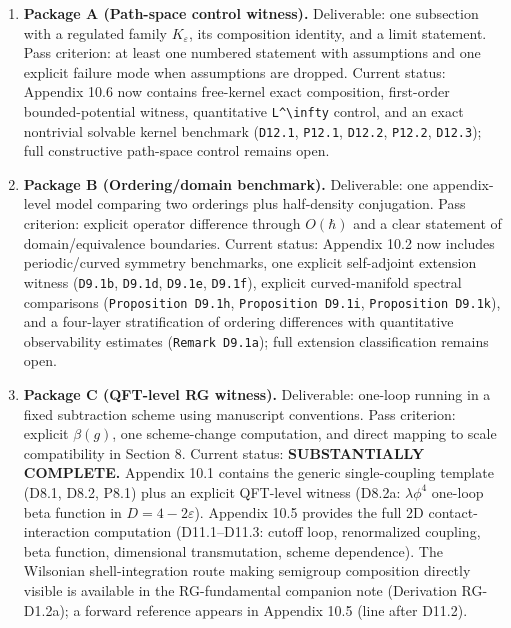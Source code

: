 \documentclass[
]{article}
\providecommand{\tightlist}{%
  \setlength{\itemsep}{0pt}\setlength{\parskip}{0pt}}
\begin{document}
\begin{enumerate}
\def\labelenumi{\arabic{enumi}.}
\tightlist
\item
  \textbf{Package A (Path-space control witness).} Deliverable: one
  subsection with a regulated family \(K_\varepsilon\), its composition
  identity, and a limit statement. Pass criterion: at least one numbered
  statement with assumptions and one explicit failure mode when
  assumptions are dropped. Current status: Appendix 10.6 now contains
  free-kernel exact composition, first-order bounded-potential witness,
  quantitative \texttt{L\^{}\textbackslash{}infty} control, and an exact
  nontrivial solvable kernel benchmark (\texttt{D12.1}, \texttt{P12.1},
  \texttt{D12.2}, \texttt{P12.2}, \texttt{D12.3}); full constructive
  path-space control remains open.
\item
  \textbf{Package B (Ordering/domain benchmark).} Deliverable: one
  appendix-level model comparing two orderings plus half-density
  conjugation. Pass criterion: explicit operator difference through
  \(O(\hbar)\) and a clear statement of domain/equivalence boundaries.
  Current status: Appendix 10.2 now includes periodic/curved symmetry
  benchmarks, one explicit self-adjoint extension witness
  (\texttt{D9.1b}, \texttt{D9.1d}, \texttt{D9.1e}, \texttt{D9.1f}),
  explicit curved-manifold spectral comparisons
  (\texttt{Proposition\ D9.1h}, \texttt{Proposition\ D9.1i},
  \texttt{Proposition\ D9.1k}), and a four-layer stratification of
  ordering differences with quantitative observability estimates
  (\texttt{Remark\ D9.1a}); full extension classification remains open.
\item
  \textbf{Package C (QFT-level RG witness).} Deliverable: one-loop
  running in a fixed subtraction scheme using manuscript conventions.
  Pass criterion: explicit \(\beta(g)\), one scheme-change computation,
  and direct mapping to scale compatibility in Section 8. Current
  status: \textbf{SUBSTANTIALLY COMPLETE.} Appendix 10.1 contains the
  generic single-coupling template (D8.1, D8.2, P8.1) plus an explicit
  QFT-level witness (D8.2a: \(\lambda\phi^4\) one-loop beta function in
  \(D=4-2\varepsilon\)). Appendix 10.5 provides the full 2D
  contact-interaction computation (D11.1--D11.3: cutoff loop,
  renormalized coupling, beta function, dimensional transmutation,
  scheme dependence). The Wilsonian shell-integration route making
  semigroup composition directly visible is available in the
  RG-fundamental companion note (Derivation RG-D1.2a); a forward
  reference appears in Appendix 10.5 (line after D11.2).

\end{enumerate}
\end{document}
